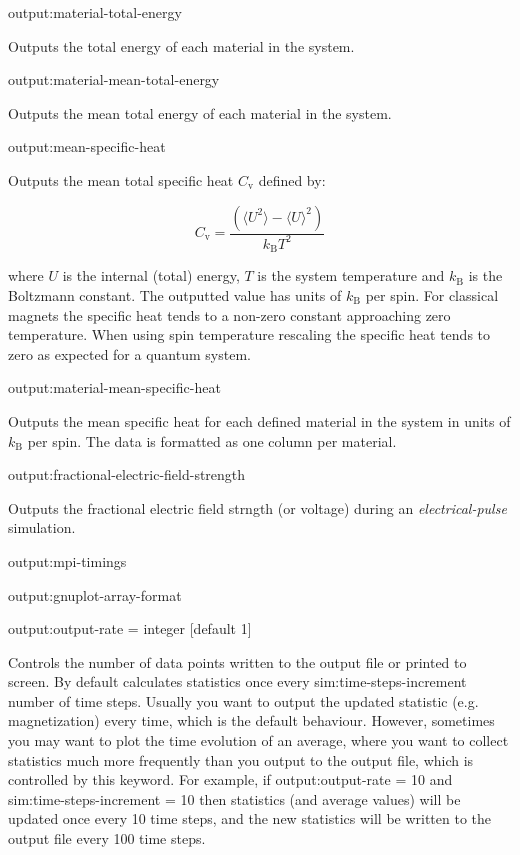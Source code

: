 {\zicf output:material-total-energy} Outputs the total energy of each material in the system.

{\zicf output:material-mean-total-energy} Outputs the mean total energy of each material in the system.

{\zicf output:mean-specific-heat} Outputs the mean total specific heat $C_{\mathrm{v}}$ defined by:

\begin{equation*}
C_{\mathrm{v}} = \frac{\left(\langle U^2 \rangle - \langle U \rangle^2 \right)}{k_{\mathrm{B}} T^2}
\end{equation*}

\noindent where $U$ is the internal (total) energy, $T$ is the system temperature and $k_{\mathrm{B}}$ is the Boltzmann constant. The outputted value has units of $k_{\mathrm{B}}$ per spin. For classical magnets the specific heat tends to a non-zero constant approaching zero temperature. When using spin temperature rescaling the specific heat tends to zero as expected for a quantum system.

{\zicf output:material-mean-specific-heat} Outputs the mean specific heat for each defined material in the system in units of $k_{\mathrm{B}}$ per spin. The data is formatted as one column per material.

{\zicf output:fractional-electric-field-strength}
Outputs the fractional electric field strngth (or voltage) during an \textit{electrical-pulse} simulation.

{\zicf output:mpi-timings}

{\zicf output:gnuplot-array-format}

{\zicf output:output-rate = integer [default 1]} Controls the number of data points written to the output file or printed to screen. By default \vampire calculates statistics once every sim:time-steps-increment number of time steps. Usually you want to output the updated statistic (e.g. magnetization) every time, which is the default behaviour. However, sometimes you may want to plot the time evolution of an average, where you want to collect statistics much more frequently than you output to the output file, which is controlled by this keyword. For example, if output:output-rate = 10 and sim:time-steps-increment = 10 then statistics (and average values) will be updated once every 10 time steps, and the new statistics will be written to the output file every 100 time steps.


